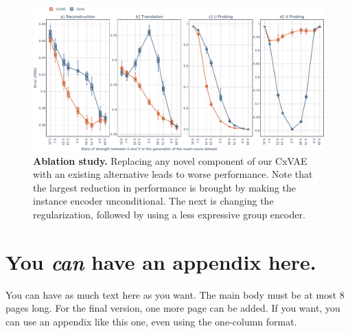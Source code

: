 \documentclass[nohyperref]{article}
\theoremstyle{plain}
\theoremstyle{definition}
\theoremstyle{remark}
\begin{document}
\begin{figure}[t]
\vskip 0.2in
\begin{center}
\centerline{\includegraphics[width=\textwidth]{files/uv_ratio.pdf}}
\caption{\textbf{Ablation study.} Replacing any novel component of our CxVAE with an existing alternative leads to worse performance. Note that the largest reduction in performance is brought by making the instance encoder unconditional. The next is changing the regularization, followed by using a less expressive group encoder.}
\label{ablation}
\end{center}
\vskip -0.2in
\end{figure}





\newpage
\appendix
\onecolumn
\section{You \emph{can} have an appendix here.}

You can have as much text here as you want. The main body must be at most $8$ pages long.
For the final version, one more page can be added.
If you want, you can use an appendix like this one, even using the one-column format.
\end{document}
